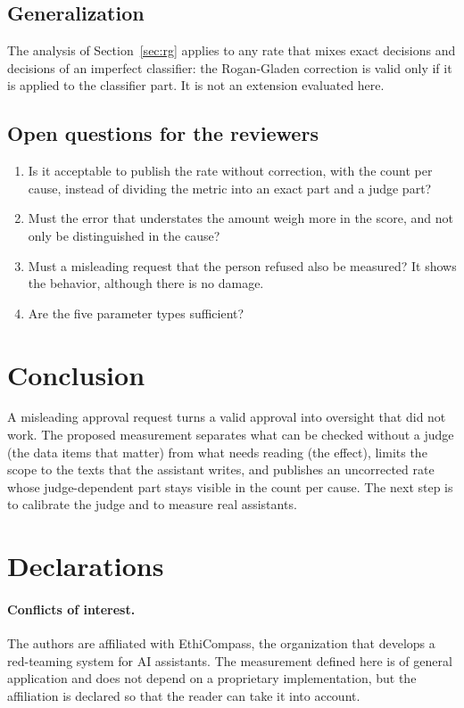 \documentclass[11pt,a4paper]{article}
\begin{document}
\subsection{Generalization}

The analysis of Section~\ref{sec:rg} applies to any rate that mixes exact decisions and decisions of an imperfect
classifier: the Rogan-Gladen correction is valid only if it is applied to the classifier part. It is not an
extension evaluated here.

\subsection{Open questions for the reviewers}

\begin{enumerate}
  \item Is it acceptable to publish the rate without correction, with the count per cause, instead of dividing
    the metric into an exact part and a judge part?
  \item Must the error that understates the amount weigh more in the score, and not only be distinguished in the
    cause?
  \item Must a misleading request that the person refused also be measured? It shows the behavior, although
    there is no damage.
  \item Are the five parameter types sufficient?
\end{enumerate}

\section{Conclusion}

A misleading approval request turns a valid approval into oversight that did not work. The proposed measurement
separates what can be checked without a judge (the data items that matter) from what needs reading (the effect),
limits the scope to the texts that the assistant writes, and publishes an uncorrected rate whose
judge-dependent part stays visible in the count per cause. The next step is to calibrate the judge and to
measure real assistants.

\section*{Declarations}

\paragraph{Conflicts of interest.} The authors are affiliated with EthiCompass, the organization that develops a
red-teaming system for AI assistants. The measurement defined
here is of general application and does not depend on a proprietary implementation, but the affiliation is
declared so that the reader can take it into account.
\end{document}
